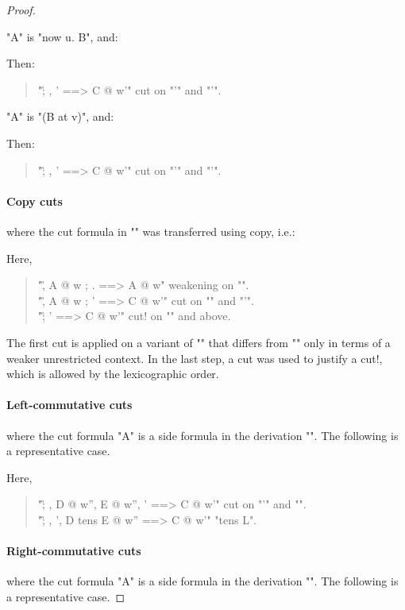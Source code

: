 \documentclass{article}
\begin{document}
\begin{lem}
\begin{proof}
\begin{ecom} 
  \item "A" is "now u. B", and:
    
    Then:
    \begin{quote}
      "\G ; \D, \D' ==> C @ {w'}" \by cut on "\DD'" and "\EE'".
    \end{quote}

  \item "A" is "(B at v)", and:
    
    Then:
    \begin{quote}
      "\G ; \D, \D' ==> C @ {w'}" \by cut on "\DD'" and "\EE'".
    \end{quote}
  \end{ecom}

  \paragraph{Copy cuts} where the cut formula in "\EE" was transferred using copy, i.e.:
  
  Here,
  \begin{quote}
    "\G, A @ w ; . ==> A @ w" \by weakening on "\DD".\\
    "\G, A @ w ; \D' ==> C @ {w'}" \by cut on "\DD" and "\EE'".\\
    "\G ; \D' ==> C @ {w'}" \by cut! on "\DD" and above.
  \end{quote}
  The first cut is applied on a variant of "\DD" that differs from "\DD" only in terms of a weaker
  unrestricted context. In the last step, a cut was used to justify a cut!, which is allowed by the
  lexicographic order.

  \paragraph{Left-commutative cuts} where the cut formula "A" is a side formula in the derivation
  "\DD". The following is a representative case.
  
  Here,
  \begin{quote}
    "\G ; \D, D @ {w''}, E @ {w''}, \D' ==> C @ {w'}" \by cut on "\DD'" and "\EE". \\
    "\G ; \D, \D', D tens E @ {w''} ==> C @ {w'}" \by "tens L".
  \end{quote}

  \paragraph{Right-commutative cuts} where the cut formula "A" is a side formula in the derivation
  "\EE". The following is a representative case.
  

\end{proof}
\end{lem}
\end{document}
